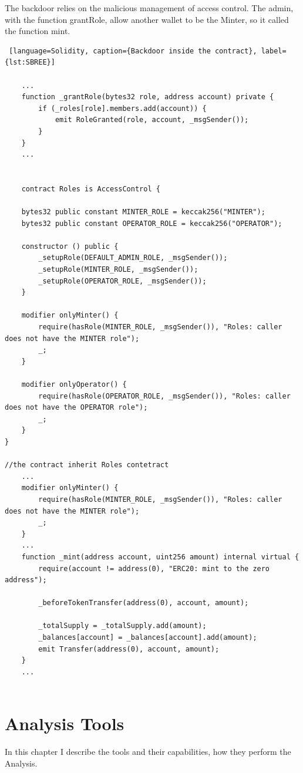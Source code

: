 The backdoor relies on the malicious management of access control. The admin, with the function grantRole, allow another wallet to be the Minter, so it called the function mint.
\begin{lstlisting} [language=Solidity, caption={Backdoor inside the contract}, label={lst:SBREE}]
    
    ... 
    function _grantRole(bytes32 role, address account) private {
        if (_roles[role].members.add(account)) {
            emit RoleGranted(role, account, _msgSender());
        }
    }
    ... 


    contract Roles is AccessControl {

    bytes32 public constant MINTER_ROLE = keccak256("MINTER");
    bytes32 public constant OPERATOR_ROLE = keccak256("OPERATOR");

    constructor () public {
        _setupRole(DEFAULT_ADMIN_ROLE, _msgSender());
        _setupRole(MINTER_ROLE, _msgSender());
        _setupRole(OPERATOR_ROLE, _msgSender());
    }

    modifier onlyMinter() {
        require(hasRole(MINTER_ROLE, _msgSender()), "Roles: caller does not have the MINTER role");
        _;
    }

    modifier onlyOperator() {
        require(hasRole(OPERATOR_ROLE, _msgSender()), "Roles: caller does not have the OPERATOR role");
        _;
    }
}

//the contract inherit Roles contetract
    ... 
    modifier onlyMinter() {
        require(hasRole(MINTER_ROLE, _msgSender()), "Roles: caller does not have the MINTER role");
        _;
    }
    ... 
    function _mint(address account, uint256 amount) internal virtual {
        require(account != address(0), "ERC20: mint to the zero address");

        _beforeTokenTransfer(address(0), account, amount);

        _totalSupply = _totalSupply.add(amount);
        _balances[account] = _balances[account].add(amount);
        emit Transfer(address(0), account, amount);
    }
    ... 


\end{lstlisting} 
    

\chapter{Analysis Tools}
\label{ch:Tools}
In this chapter I describe the tools and their capabilities, how they perform the Analysis.

